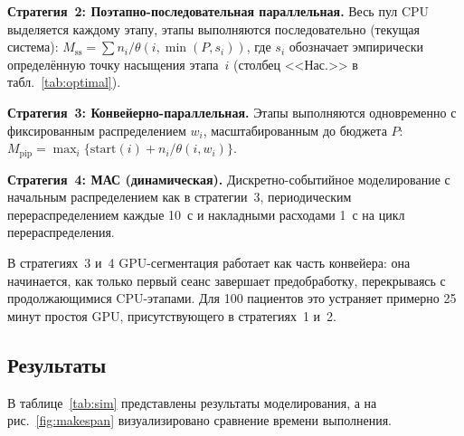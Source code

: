 \documentclass[conference]{IEEEtran}
\begin{document}
\textbf{Стратегия~2: Поэтапно-последовательная параллельная.} Весь пул CPU выделяется каждому этапу, этапы выполняются последовательно (текущая система): $M_{\text{ss}} = \sum n_i / \theta(i, \min(P, s_i))$, где $s_i$ обозначает эмпирически определённую точку насыщения этапа~$i$ (столбец <<Нас.>> в табл.~\ref{tab:optimal}).

\textbf{Стратегия~3: Конвейерно-параллельная.} Этапы выполняются одновременно с фиксированным распределением $w_i$, масштабированным до бюджета $P$: $M_{\text{pip}} = \max_i \{ \text{start}(i) + n_i / \theta(i, w_i) \}$.

\textbf{Стратегия~4: МАС (динамическая).} Дискретно-событийное моделирование с начальным распределением как в стратегии~3, периодическим перераспределением каждые 10~с и накладными расходами 1~с на цикл перераспределения.

В стратегиях~3 и~4 GPU-сегментация работает как часть конвейера: она начинается, как только первый сеанс завершает предобработку, перекрываясь с продолжающимися CPU-этапами. Для 100 пациентов это устраняет примерно 25 минут простоя GPU, присутствующего в стратегиях~1 и~2.

\subsection{Результаты}

В таблице~\ref{tab:sim} представлены результаты моделирования, а на рис.~\ref{fig:makespan} визуализировано сравнение времени выполнения.
\end{document}
